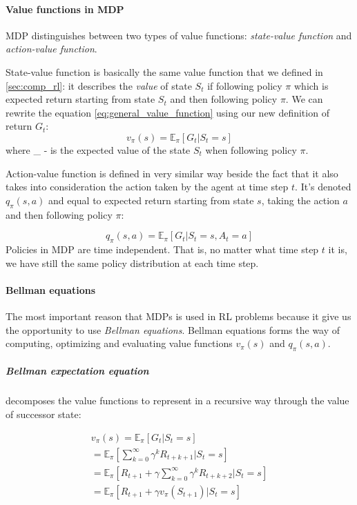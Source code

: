 \paragraph{Value functions in MDP} MDP distinguishes between two types of value functions:
\emph{state-value function} and \emph{action-value function}.

State-value function is basically the same value function that we defined in \autoref{sec:comp_rl}:
it describes the \emph{value} of state $S_t$ if following policy $\pi$ which is expected return
starting from state $S_t$ and then following policy $\pi$. We can rewrite the equation \ref{eq:general_value_function}
using our new definition of return $G_t$:
\begin{equation} \label{eq:value_state}
	v_{\pi}(s) = \mathbb{E}_{\pi} [G_t |S_t = s]
\end{equation}
where _{\pi} - is the expected value of the state $S_t$ when
following policy $\pi$.

Action-value function is defined in very similar way beside the fact that it also takes
into consideration the action taken by the agent at time step $t$. It's denoted $q_{\pi}(s, a)$
and equal to expected return starting from state $s$, taking the action $a$ and then following
policy $\pi$:

\begin{equation} \label{eq:action_value_func}
	q_{\pi}(s, a) = \mathbb{E}_{\pi} [G_t |S_t = s, A_t = a]
\end{equation}
Policies in MDP are time independent. That is, no matter what time step $t$ it is, we have still the same
policy distribution at each time step.


\paragraph{Bellman equations} The most important reason that MDPs is used in RL problems because
it give us the opportunity to use \emph{Bellman equations}. Bellman equations forms the way
of computing, optimizing and evaluating value functions $v_{\pi}(s)$ and $q_{\pi}(s, a)$.

\subparagraph{Bellman expectation equation} decomposes the value functions to represent
in a recursive way through the value of successor state:

\begin{align*}
	v_{\pi}(s) = \mathbb{E}_{\pi} [G_t |S_t = s] \\
		= \mathbb{E}_{\pi} [\sum_{k=0}^{\infty} \gamma^k R_{t+k+1} |S_t = s] \\
		= \mathbb{E}_{\pi} [R_{t+1} + \gamma \sum_{k=0}^{\infty} \gamma^k R_{t+k+2} |S_t = s] \\
		= \mathbb{E}_{\pi} [R_{t+1} + \gamma v_{\pi}(S_{t+1}) | S_t = s]
\end{align*}

